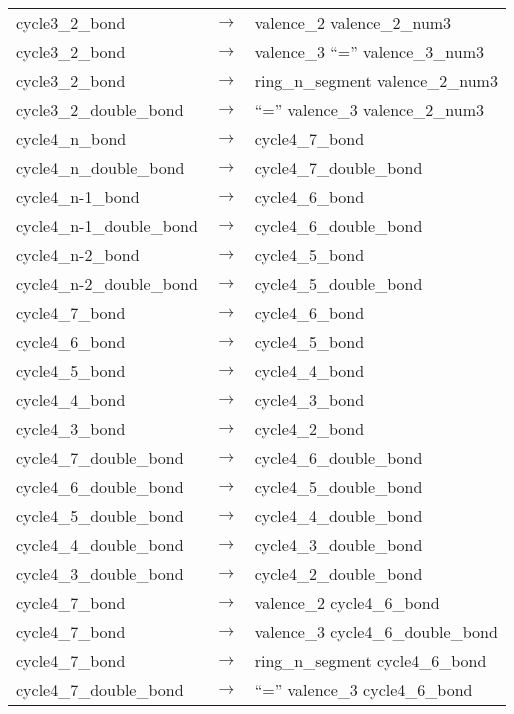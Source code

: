 \documentclass[../Document.tex]{subfiles}
\begin{document}
\begin{longtable}{m{} p{} p{}}
    cycle3\_2\_bond & $\rightarrow$ & valence\_2 valence\_2\_num3 \\
    cycle3\_2\_bond & $\rightarrow$ & valence\_3 ``='' valence\_3\_num3 \\
    cycle3\_2\_bond & $\rightarrow$ & ring\_n\_segment valence\_2\_num3 \\
    cycle3\_2\_double\_bond & $\rightarrow$ & ``='' valence\_3 valence\_2\_num3 \\
    cycle4\_n\_bond & $\rightarrow$ & cycle4\_7\_bond \\
    cycle4\_n\_double\_bond & $\rightarrow$ & cycle4\_7\_double\_bond \\
    cycle4\_n-1\_bond & $\rightarrow$ & cycle4\_6\_bond \\
    cycle4\_n-1\_double\_bond & $\rightarrow$ & cycle4\_6\_double\_bond \\
    cycle4\_n-2\_bond & $\rightarrow$ & cycle4\_5\_bond \\
    cycle4\_n-2\_double\_bond & $\rightarrow$ & cycle4\_5\_double\_bond \\
    cycle4\_7\_bond & $\rightarrow$ & cycle4\_6\_bond \\
    cycle4\_6\_bond & $\rightarrow$ & cycle4\_5\_bond \\
    cycle4\_5\_bond & $\rightarrow$ & cycle4\_4\_bond \\
    cycle4\_4\_bond & $\rightarrow$ & cycle4\_3\_bond \\
    cycle4\_3\_bond & $\rightarrow$ & cycle4\_2\_bond \\
    cycle4\_7\_double\_bond & $\rightarrow$ & cycle4\_6\_double\_bond \\
    cycle4\_6\_double\_bond & $\rightarrow$ & cycle4\_5\_double\_bond \\
    cycle4\_5\_double\_bond & $\rightarrow$ & cycle4\_4\_double\_bond \\
    cycle4\_4\_double\_bond & $\rightarrow$ & cycle4\_3\_double\_bond \\
    cycle4\_3\_double\_bond & $\rightarrow$ & cycle4\_2\_double\_bond \\
    cycle4\_7\_bond & $\rightarrow$ & valence\_2 cycle4\_6\_bond \\
    cycle4\_7\_bond & $\rightarrow$ & valence\_3 cycle4\_6\_double\_bond \\
    cycle4\_7\_bond & $\rightarrow$ & ring\_n\_segment cycle4\_6\_bond \\
    cycle4\_7\_double\_bond & $\rightarrow$ & ``='' valence\_3 cycle4\_6\_bond \\

\end{longtable}
\end{document}
